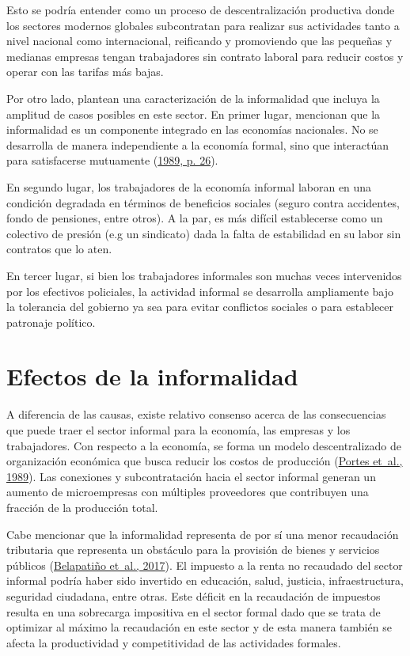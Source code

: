 \documentclass[
  letterpaper,
  12pt,
  oneside,
  spanish,
  doublespacing,
  headsepline,
  parskip]{MastersDoctoralThesis}
\begin{document}
Esto se podría entender como un proceso de descentralización productiva
donde los sectores modernos globales subcontratan para realizar sus
actividades tanto a nivel nacional como internacional, reificando y
promoviendo que las pequeñas y medianas empresas tengan trabajadores sin
contrato laboral para reducir costos y operar con las tarifas más bajas.

Por otro lado, plantean una caracterización de la informalidad que
incluya la amplitud de casos posibles en este sector. En primer lugar,
mencionan que la informalidad es un componente integrado en las
economías nacionales. No se desarrolla de manera independiente a la
economía formal, sino que interactúan para satisfacerse mutuamente
(\protect\hyperlink{ref-theinfo1989}{1989, p. 26}).

En segundo lugar, los trabajadores de la economía informal laboran en
una condición degradada en términos de beneficios sociales (seguro
contra accidentes, fondo de pensiones, entre otros). A la par, es más
difícil establecerse como un colectivo de presión (e.g un sindicato)
dada la falta de estabilidad en su labor sin contratos que lo aten.

En tercer lugar, si bien los trabajadores informales son muchas veces
intervenidos por los efectivos policiales, la actividad informal se
desarrolla ampliamente bajo la tolerancia del gobierno ya sea para
evitar conflictos sociales o para establecer patronaje político.

\hypertarget{efectos-de-la-informalidad}{%
\section{Efectos de la informalidad}\label{efectos-de-la-informalidad}}

A diferencia de las causas, existe relativo consenso acerca de las
consecuencias que puede traer el sector informal para la economía, las
empresas y los trabajadores. Con respecto a la economía, se forma un
modelo descentralizado de organización económica que busca reducir los
costos de producción (\protect\hyperlink{ref-theinfo1989}{Portes et~al.,
1989}). Las conexiones y subcontratación hacia el sector informal
generan un aumento de microempresas con múltiples proveedores que
contribuyen una fracción de la producción total.

Cabe mencionar que la informalidad representa de por sí una menor
recaudación tributaria que representa un obstáculo para la provisión de
bienes y servicios públicos
(\protect\hyperlink{ref-belapatiuxf1o2017}{Belapatiño et~al., 2017}). El
impuesto a la renta no recaudado del sector informal podría haber sido
invertido en educación, salud, justicia, infraestructura, seguridad
ciudadana, entre otras. Este déficit en la recaudación de impuestos
resulta en una sobrecarga impositiva en el sector formal dado que se
trata de optimizar al máximo la recaudación en este sector y de esta
manera también se afecta la productividad y competitividad de las
actividades formales.
\end{document}
